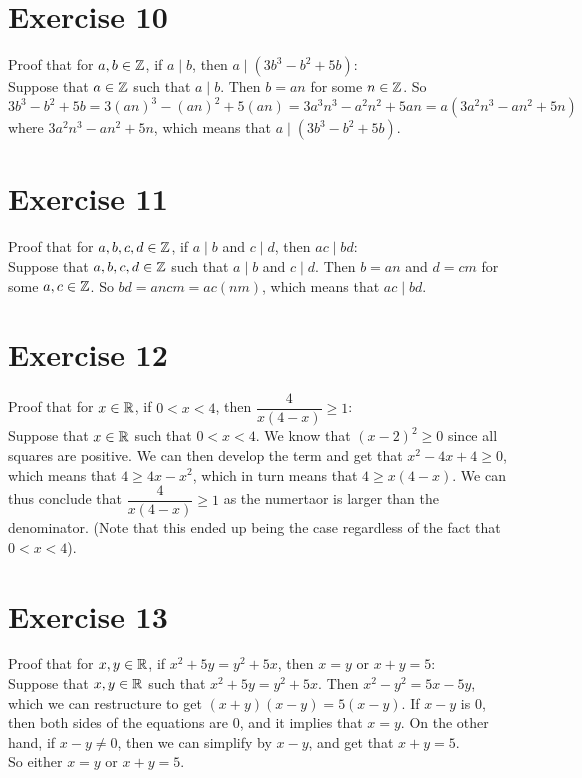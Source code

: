 \documentclass[12pt]{article}
\begin{document}
    \section*{Exercise 10}
    Proof that for $a, b \in \mathbb{Z}$,
    if $a \mid b$,
    then $a \mid (3b^3 - b^2 + 5b)$: \\
    Suppose that $a \in \mathbb{Z}$
    such that $a \mid b$.
    Then $b = an$ for some $n \in \mathbb{Z}$.
    So 
    \[ 3b^3 - b^2 + 5b = 3(an)^3 - (an)^2 + 5(an)
    = 3a^3n^3 - a^2n^2 + 5an = a(3a^2n^3 - an^2 + 5n) \]
    where $3a^2n^3 - an^2 + 5n$,
    which means that $a \mid (3b^3 - b^2 + 5b)$. \\

    \section*{Exercise 11}
    Proof that for $a, b, c, d \in \mathbb{Z}$,
    if $a \mid b$ and $c \mid d$,
    then $ac \mid bd$: \\
    Suppose that $a, b, c, d \in \mathbb{Z}$
    such that $a \mid b$ and $c \mid d$.
    Then $b = an$ and $d = cm$ for some $a, c \in \mathbb{Z}$.
    So $bd = ancm = ac(nm)$,
    which means that $ac \mid bd$. \\

    \section*{Exercise 12}
    Proof that for $x \in \mathbb{R}$,
    if $0 < x < 4$,
    then $\dfrac{4}{x(4-x)} \geqslant 1$: \\
    Suppose that $x \in \mathbb{R}$
    such that $0 < x < 4$.
    We know that $(x-2)^2 \geqslant 0$ since all squares are positive.
    We can then develop the term and get
    that $x^2 - 4x + 4 \geqslant 0$,
    which means that $4 \geqslant 4x - x^2$,
    which in turn means that $4 \geqslant x(4 - x)$.
    We can thus conclude that $\dfrac{4}{x(4-x)} \geqslant 1$
    as the numertaor is larger than the denominator.
    (Note that this ended up being the case
    regardless of the fact that $0 < x < 4$). \\

    \section*{Exercise 13}
    Proof that for $x, y \in \mathbb{R}$,
    if $x^2+5y = y^2+5x$,
    then $x = y$ or $x+y = 5$: \\
    Suppose that $x, y \in \mathbb{R}$
    such that $x^2+5y = y^2+5x$.
    Then $x^2 - y^2 = 5x - 5y$,
    which we can restructure to get $(x+y)(x-y) = 5(x - y)$.
    If $x-y$ is $0$,
    then both sides of the equations are $0$,
    and it implies that $x = y$.
    On the other hand, if $x-y \neq 0$,
    then we can simplify by $x-y$,
    and get that $x+y = 5$. \\
    So either $x = y$ or $x+y = 5$. \\
\end{document}
